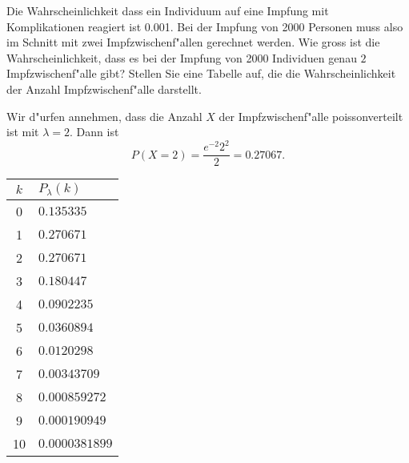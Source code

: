 Die Wahrscheinlichkeit dass ein Individuum auf eine Impfung
mit Komplikationen reagiert ist 0.001.
Bei der Impfung von 2000 Personen muss also im Schnitt
mit zwei Impfzwischenf"allen gerechnet werden.
Wie gross ist die Wahrscheinlichkeit, dass es
bei der Impfung von 2000 Individuen genau $2$ Impfzwischenf"alle
gibt? Stellen Sie eine Tabelle auf, die die Wahrscheinlichkeit
der Anzahl Impfzwischenf"alle darstellt.

\begin{loesung}
Wir d"urfen annehmen, dass die Anzahl $X$ der Impfzwischenf"alle
poissonverteilt ist mit $\lambda=2$. Dann ist
$$P(X=2)=\frac{e^{-2}2^2}2=0.27067.
$$
\begin{center}
\begin{tabular}{|c|l|}
\hline
$k$&$P_\lambda(k)$\\
\hline
0&$0.135335$\\
1&$0.270671$\\
2&$0.270671$\\
3&$0.180447$\\
4&$0.0902235$\\
5&$0.0360894$\\
6&$0.0120298$\\
7&$0.00343709$\\
8&$0.000859272$\\
9&$0.000190949$\\
10&$0.0000381899$\\
\hline
\end{tabular}
\end{center}
\end{loesung}
